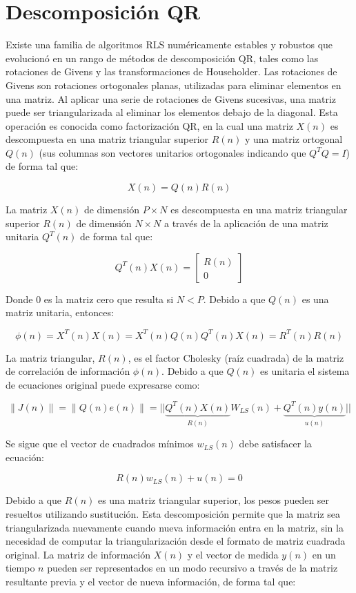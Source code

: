 \section{Descomposición QR}
\label{sec:descomposicion_qr}

Existe una familia de algoritmos RLS numéricamente estables y robustos que evolucionó en un rango de métodos de descomposición QR, tales como las rotaciones de Givens y las transformaciones de Householder. Las rotaciones de Givens son rotaciones ortogonales planas, utilizadas para eliminar elementos en una matriz. Al aplicar una serie de rotaciones de Givens sucesivas, una matriz puede ser triangularizada al eliminar los elementos debajo de la diagonal. Esta operación es conocida como factorización QR, en la cual una matriz $X(n)$ es descompuesta en una matriz triangular superior $R(n)$ y una matriz ortogonal $Q(n)$ (sus columnas son vectores unitarios ortogonales indicando que $Q^T Q = I$) de forma tal que:

\[
X(n) = Q(n)R(n)
\]

La matriz $X(n)$ de dimensión $P \times N$ es descompuesta en una matriz triangular superior $R(n)$ de dimensión $N \times N$ a través de la aplicación de una matriz unitaria $Q^T(n)$ de forma tal que:

\[
Q^T(n)X(n)=
	\left[ 
		\begin{array}{c}
			R(n) \\
			0
		\end{array}
	\right] 
\]

Donde 0 es la matriz cero que resulta si $N < P$. Debido a que $Q(n)$ es una matriz unitaria, entonces:

\[
\phi(n) = X^T(n)X(n) = X^T(n)Q(n)Q^T(n)X(n) = R^T(n)R(n)
\]

La matriz triangular, $R(n)$, es el factor Cholesky (raíz cuadrada) de la matriz de correlación de información $\phi(n)$. Debido a que $Q(n)$ es unitaria el sistema de ecuaciones original puede expresarse como:

\[
\| J(n) \| = \| Q(n)e(n) \| = \Big|\Big| \underbrace{Q^T(n)X(n)}_{R(n)}W_{LS}(n) + \underbrace{Q^T(n)y(n)}_{u(n)} \Big|\Big|
\]

Se sigue que el vector de cuadrados mínimos $ w_{LS}(n) $ debe satisfacer la ecuación:

\[
R(n)w_{LS}(n) + u(n) = 0
\]

Debido a que $ R(n)$ es una matriz triangular superior, los pesos pueden ser resueltos utilizando sustitución. Esta descomposición permite que la matriz sea triangularizada nuevamente cuando nueva información entra en la matriz, sin la necesidad de computar la triangularización desde el formato de matriz cuadrada original. La matriz de información $X(n)$ y el vector de medida $y(n)$ en un tiempo $n$ pueden ser representados en un modo recursivo a través de la matriz resultante previa y el vector de nueva información, de forma tal que:

